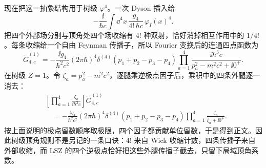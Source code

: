 \begin{derivation}
现在把这一抽象结构用于树级 $\varphi^4$。一次 Dyson 插入给
\begin{equation*}
 -\frac{\ii}{\hbar c}
 \int\dd^4x\,
 \frac{g_4}{4!\,\hbar c}\,
 \varphi_I(x)^4.
\end{equation*}
把四个外部场分别与顶角处四个场收缩有 $4!$ 种双射，恰好消掉相互作用中的 $1/4!$。每条收缩给一个自由 Feynman 传播子，所以 Fourier 变换后的连通四点函数为
\begin{equation*}
 \widetilde G^{(1)}_{4,c}
 =-\frac{\ii g_4}{\hbar^2c^2}
 (2\pi\hbar)^4\delta^{(4)}(p_1+p_2-p_3-p_4)
 \prod_{a=1}^{4}
 \frac{\ii\hbar^3c}{p_a^2-m^2c^2+\ii0^+}.
\end{equation*}
在树级 $Z=1$。令 $\zeta_a=p_a^2-m^2c^2$，逐腿乘逆极点因子后，乘积中的四条外腿逐一消去：
\begin{align*}
 &\left[\prod_{a=1}^{4}
 \frac{\zeta_a}{\ii\hbar^3c}\right]
 \widetilde G^{(1)}_{4,c}\\
 &\quad=-\frac{\ii g_4}{\hbar^2c^2}
 (2\pi\hbar)^4\delta^{(4)}(p_1+p_2-p_3-p_4)
 \prod_{a=1}^{4}
 \frac{\zeta_a}{\zeta_a+\ii0^+}.
\end{align*}
按上面说明的极点留数顺序取极限，四个因子都贡献单位留数，于是得到正文。因此树级顶角规则不是另记的一条口诀：$4!$ 来自 Wick 收缩计数，四条传播子来自外部收缩，而 LSZ 的四个逆极点恰好把这些外腿传播子截去，只留下局域顶角系数。
\end{derivation}


